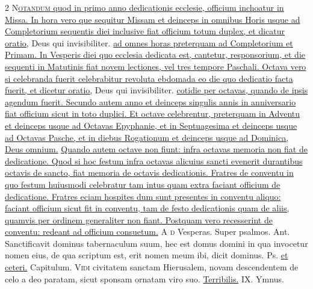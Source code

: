\begin{multicols*}{2}
\lettrine[lines=2]{\zallmancaps \color{Red} N}{}\ul{\textsc{otandum} quod in primo anno dedicationis ecclesie, officium inchoatur in Missa. In hora vero que sequitur Missam et deinceps in omnibus Horis usque ad Completorium sequentis diei inclusive fiat officium totum duplex, et dicatur oratio,} Deus qui invisibiliter. \ul{ad omnes horas preterquam ad Completorium et Primam. In Vesperis diei quo ecclesia dedicata est, cantetur, responsorium, et die sequenti in Matutinis fiat novem lectiones, vel tres tempore Paschali. Octava vero si celebranda fuerit celebrabitur revoluta ebdomada eo die quo dedicatio facta fuerit, et dicetur oratio,} Deus qui invisibiliter. \ul{cotidie per octavas, quando de ipsis agendum fuerit. Secundo autem anno et deinceps singulis annis in anniversario fiat officium sicut in toto duplici. Et octave celebrentur, preterquam in Adventu et deinceps usque ad Octavas Epyphanie, et in Septuagesima et deinceps usque ad Octavas Pasche, et in diebus Rogationum et deinceps usque ad Dominica,} \hyperlink{deus-omnium}{Deus omnium.} \ul{Quando autem octave non fiunt: infra octavas memoria non fiat de dedicatione. Quod si hoc festum infra octavas alicuius sancti evenerit durantibus octavis de sancto, fiat memoria de octavis dedicationis. Fratres de conventu in quo festum huiusmodi celebratur tam intus quam extra faciant officium de dedicatione. Fratres eciam hospites dum sunt presentes in conventu aliquo: faciant officium sicut fit in conventu, tam de festo dedicationis quam de aliis, quamvis per ordinem generaliter non fiant. Postquam vero recesserint de conventu: redeant ad officium consuetum.}
{\color{Red} }
\lettrine[lines=2]{\zallmancaps \color{Blue} A}{\color{Red} d} {\color{Red} Vesperas. Super psalmos. Ant.} Sanctificavit dominus tabernaculum suum, hec est domus domini in qua invocetur nomen eius, de qua scriptum est, erit nomen meum ibi, dicit dominus. {\color{Red} Ps.}  \ul{et ceteri.} {\color{Red} Capitulum.}
\lettrine[lines=2]{\zallmancaps \color{Red} V}{idi} civitatem sanctam Hierusalem, novam descendentem de celo a deo paratam, sicut sponsam ornatam viro suo. \R \hyperlink{terribilis-est-locus}{Terribilis.} {\color{Red} IX. Ymnus.}
\end{multicols*}
